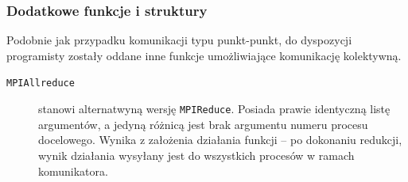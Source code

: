 \subsubsection{Dodatkowe funkcje i struktury}

Podobnie jak przypadku komunikacji typu punkt-punkt, do dyspozycji programisty zostały oddane inne funkcje umożliwiające komunikację kolektywną.

\begin{description}
	\item[\texttt{MPI\textunderscore Allreduce}] stanowi alternatwyną wersję \texttt{MPI\textunderscore Reduce}. Posiada prawie identyczną listę argumentów, a jedyną różnicą jest brak argumentu numeru procesu docelowego. Wynika z założenia działania funkcji -- po dokonaniu redukcji, wynik działania wysyłany jest do wszystkich procesów w ramach komunikatora.
\end{description}

